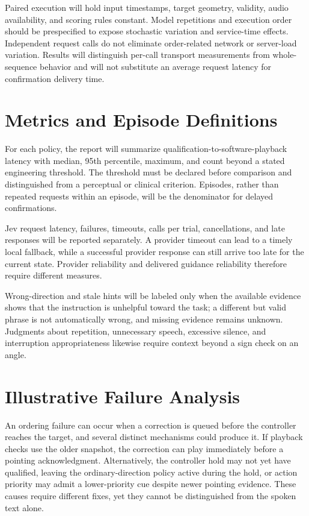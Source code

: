 Paired execution will hold input timestamps, target geometry, validity, audio availability, and scoring rules constant. Model repetitions and execution order should be prespecified to expose stochastic variation and service-time effects. Independent request calls do not eliminate order-related network or server-load variation. Results will distinguish per-call transport measurements from whole-sequence behavior and will not substitute an average request latency for confirmation delivery time.

\section{Metrics and Episode Definitions}
For each policy, the report will summarize qualification-to-software-playback latency with median, 95th percentile, maximum, and count beyond a stated engineering threshold. The threshold must be declared before comparison and distinguished from a perceptual or clinical criterion. Episodes, rather than repeated requests within an episode, will be the denominator for delayed confirmations.

Jev request latency, failures, timeouts, calls per trial, cancellations, and late responses will be reported separately. A provider timeout can lead to a timely local fallback, while a successful provider response can still arrive too late for the current state. Provider reliability and delivered guidance reliability therefore require different measures.

Wrong-direction and stale hints will be labeled only when the available evidence shows that the instruction is unhelpful toward the task; a different but valid phrase is not automatically wrong, and missing evidence remains unknown. Judgments about repetition, unnecessary speech, excessive silence, and interruption appropriateness likewise require context beyond a sign check on an angle.

\section{Illustrative Failure Analysis}
An ordering failure can occur when a correction is queued before the controller reaches the target, and several distinct mechanisms could produce it. If playback checks use the older snapshot, the correction can play immediately before a pointing acknowledgment. Alternatively, the controller hold may not yet have qualified, leaving the ordinary-direction policy active during the hold, or action priority may admit a lower-priority cue despite newer pointing evidence. These causes require different fixes, yet they cannot be distinguished from the spoken text alone.

